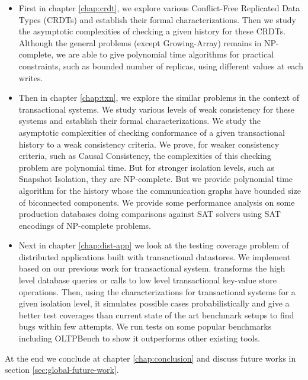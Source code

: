 \begin{itemize}
  \item First in chapter \ref{chap:crdt}, we explore various Conflict-Free Replicated Data Types (CRDTs) and establish their formal characterizations. Then we study the asymptotic complexities of checking a given history for these CRDTs. Although the general problems (except Growing-Array) remains in NP-complete, we are able to give polynomial time algorithms for practical constraints, such as bounded number of replicas, using different values at each writes.
  \item Then in chapter \ref{chap:txn}, we explore the similar problems in the context of transactional systems. We study various levels of weak consistency for these systems and establish their formal characterizations. We study the asymptotic complexities of checking conformance of a given transactional history to a weak consistency criteria. We prove, for weaker consistency criteria, such as Causal Consistency, the complexities of this checking problem are polynomial time. But for stronger isolation levels, such as Snapshot Isolation, they are NP-complete. But we provide polynomial time algorithm for the history whose the communication graphs have bounded size of biconnected components. We provide some performance analysis on some production databases doing comparisons against SAT solvers using SAT encodings of NP-complete problems.
  \item Next in chapter \ref{chap:dist-app} we look at the testing coverage problem of distributed applications built with transactional datastores. We implement \tool{} based on our previous work for transactional system. \tool{} transforms the high level database queries or calls to low level transactional key-value store operations. Then, using the characterizations for transactional systems for a given isolation level, it simulates possible cases probabilistically and give a better test coverages than current state of the art benchmark setups to find bugs within few attempts. We run tests on some popular benchmarks including OLTPBench to show it outperforms other existing tools.
\end{itemize}

At the end we conclude at chapter \ref{chap:conclusion} and discuss future works in section \ref{sec:global-future-work}.
